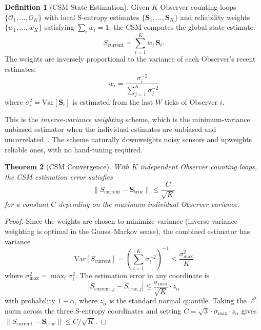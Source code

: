 \documentclass[twocolumn,10pt]{article}
\newtheorem{theorem}{Theorem}[section]
\theoremstyle{definition}
\newtheorem{definition}[theorem]{Definition}
\newcommand{\Sentropy}{\mathbf{S}}
\newcommand{\Scurrent}{S_{\mathrm{current}}}
\begin{document}
\begin{definition}[CSM State Estimation]
\label{def:csm-estimation}
Given $K$ Observer counting loops $\{\mathcal{O}_1, \ldots, \mathcal{O}_K\}$ with local S-entropy estimates $\{\Sentropy_1, \ldots, \Sentropy_K\}$ and reliability weights $\{w_1, \ldots, w_K\}$ satisfying $\sum_i w_i = 1$, the CSM computes the global state estimate:
\begin{equation}
\Scurrent = \sum_{i=1}^{K} w_i \, \Sentropy_i.
\label{eq:csm-estimate}
\end{equation}
The weights are inversely proportional to the variance of each Observer's recent estimates:
\begin{equation}
w_i = \frac{\sigma_i^{-2}}{\sum_{j=1}^{K} \sigma_j^{-2}}
\end{equation}
where $\sigma_i^2 = \mathrm{Var}[\Sentropy_i]$ is estimated from the last $W$ ticks of Observer $i$.
\end{definition}

This is the \emph{inverse-variance weighting} scheme, which is the minimum-variance unbiased estimator when the individual estimates are unbiased and uncorrelated~\cite{jaynes1957}. The scheme naturally downweights noisy sensors and upweights reliable ones, with no hand-tuning required.

\begin{theorem}[CSM Convergence]
\label{thm:csm-convergence}
With $K$ independent Observer counting loops, the CSM estimation error satisfies
\begin{equation}
\|\Scurrent - \Sentropy_{\mathrm{true}}\| \leq \frac{C}{\sqrt{K}}
\end{equation}
for a constant $C$ depending on the maximum individual Observer variance.
\end{theorem}

\begin{proof}
Since the weights are chosen to minimize variance (inverse-variance weighting is optimal in the Gauss--Markov sense), the combined estimator has variance
\[
\mathrm{Var}[\Scurrent] = \left(\sum_{i=1}^K \sigma_i^{-2}\right)^{-1} \leq \frac{\sigma_{\max}^2}{K}
\]
where $\sigma_{\max}^2 = \max_i \sigma_i^2$. The estimation error in any coordinate is
\[
|S_{\mathrm{current},j} - S_{\mathrm{true},j}| \leq \frac{\sigma_{\max}}{\sqrt{K}} \cdot z_\alpha
\]
with probability $1-\alpha$, where $z_\alpha$ is the standard normal quantile. Taking the $\ell^2$ norm across the three S-entropy coordinates and setting $C = \sqrt{3} \cdot \sigma_{\max} \cdot z_\alpha$ gives $\|\Scurrent - \Sentropy_{\mathrm{true}}\| \leq C/\sqrt{K}$.
\end{proof}
\end{document}
